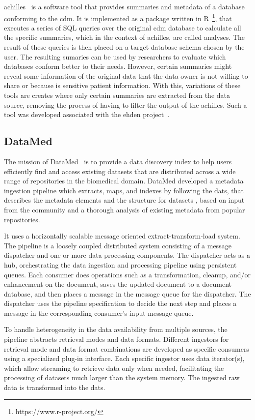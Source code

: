 \gls{achilles}~\cite{achilles-github} is a software tool that provides summaries and metadata of a database conforming to the \gls{cdm}.
It is implemented as a package written in R~\footnote{https://www.r-project.org/}, that executes a series of SQL queries over the original \gls{cdm} database to calculate all the specific summaries, which in the context of \gls{achilles}, are called analyses.
The result of these queries is then placed on a target database schema chosen by the user.
The resulting sumaries can be used by researchers to evaluate which databases conform better to their needs.
However, certain summaries might reveal some information of the original data that the data owner is not willing to share or because is sensitive patient information.
With this, variations of these tools are creates where only certain summaries are extracted from the data source, removing the process of having to filter the output of the \gls{achilles}.
Such a tool was developed associated with the \gls{ehden} project~\cite{peters-tool}.

\subsection*{DataMed}
The mission of DataMed~\cite{datamed} is to provide a data discovery index to help users efficiently find and access existing datasets that are distributed across a wide range of repositories in the biomedical domain.
DataMed developed a metadata ingestion pipeline which extracts, maps, and indexes by following the \gls{dats}, that describes the metadata elements and the structure for datasets \cite{dats}, based on input from the community and a thorough analysis of existing metadata from popular repositories.

It uses a horizontally scalable message oriented extract-transform-load system.
The pipeline is a loosely coupled distributed system consisting of a message dispatcher and one or more data processing components.
The dispatcher acts as a hub, orchestrating the data ingestion and processing pipeline using persistent queues.
Each consumer does operations such as a transformation, cleanup, and/or enhancement on the document, saves the updated document to a document database, and then places a message in the message queue for the dispatcher.
The dispatcher uses the pipeline specification to decide the next step and places a message in the corresponding consumer’s input message queue.

To handle heterogeneity in the data availability from multiple sources, the pipeline abstracts retrieval modes and data formats.
Different ingestors for retrieval mode and data format combinations are developed as specific consumers using a specialized plug-in interface.
Each specific ingestor uses data iterator(s), which allow streaming to retrieve data only when needed, facilitating the processing of datasets much larger than the system memory.
The ingested raw data is transformed into the \gls{dats}.

